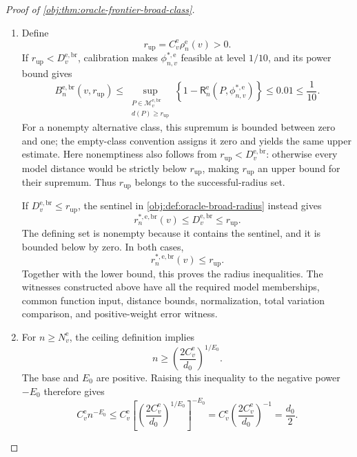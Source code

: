 \documentclass[11pt]{article}
\begin{document}
\begin{proof}[Proof of \cref{obj:thm:oracle-frontier-broad-class}]
\begin{enumerate}
\item Define
\[
r_{\mathrm{up}}=C_v^{\mathrm e}\rho_n^{\mathrm e}(v)>0.
\]
If \(r_{\mathrm{up}}<D_v^{\mathrm{e,br}}\), calibration makes
\(\phi^{*,\mathrm e}_{n,v}\) feasible at level \(1/10\), and its power bound gives
\[
B_n^{\mathrm{e,br}}(v,r_{\mathrm{up}})
\le
\sup_{\substack{P\in\mathcal M_v^{\mathrm{e,br}}\\d(P)\ge r_{\mathrm{up}}}}
\left\{1-\mathsf R_n^{\mathrm e}(P,\phi^{*,\mathrm e}_{n,v})\right\}
\le0.01\le\frac1{10}.
\]
For a nonempty alternative class, this supremum is bounded between zero and one; the empty-class convention assigns it zero and yields the same upper estimate. Here nonemptiness also follows from
\(r_{\mathrm{up}}<D_v^{\mathrm{e,br}}\): otherwise every model distance would be strictly below \(r_{\mathrm{up}}\), making \(r_{\mathrm{up}}\) an upper bound for their supremum. Thus \(r_{\mathrm{up}}\) belongs to the successful-radius set.

If \(D_v^{\mathrm{e,br}}\le r_{\mathrm{up}}\), the sentinel in
\cref{obj:def:oracle-broad-radius} instead gives
\[
r_n^{*,\mathrm{e,br}}(v)
\le D_v^{\mathrm{e,br}}\le r_{\mathrm{up}}.
\]
The defining set is nonempty because it contains the sentinel, and it is bounded below by zero. In both cases,
\[
r_n^{*,\mathrm{e,br}}(v)\le r_{\mathrm{up}}.
\]
Together with the lower bound, this proves the radius inequalities. The witnesses constructed above have all the required model memberships, common function input, distance bounds, normalization, total variation comparison, and positive-weight error witness.

\item For \(n\ge N_v^{\mathrm e}\), the ceiling definition implies
\[
n\ge\left(\frac{2C_v^{\mathrm e}}{d_0}\right)^{1/E_0}.
\]
The base and \(E_0\) are positive. Raising this inequality to the negative power \(-E_0\) therefore gives
\[
C_v^{\mathrm e}n^{-E_0}
\le
C_v^{\mathrm e}
\left[
\left(\frac{2C_v^{\mathrm e}}{d_0}\right)^{1/E_0}
\right]^{-E_0}
=
C_v^{\mathrm e}\left(\frac{2C_v^{\mathrm e}}{d_0}\right)^{-1}
=\frac{d_0}{2}.
\]


\end{enumerate}
\end{proof}
\end{document}
